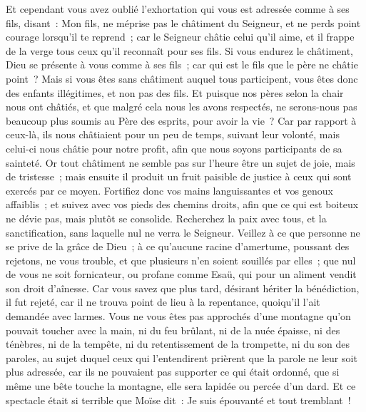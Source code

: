 \begin{multicols}{2}
Et cependant vous avez oublié l'exhortation qui vous est adressée comme à ses fils, disant~: Mon fils, ne méprise pas le châtiment du Seigneur, et ne perds point courage lorsqu'il te reprend~;
car le Seigneur châtie celui qu'il aime, et il frappe de la verge tous ceux qu'il reconnaît pour ses fils.
Si vous endurez le châtiment, Dieu se présente à vous comme à ses fils~; car qui est le fils que le père ne châtie point~?
Mais si vous êtes sans châtiment auquel tous participent, vous êtes donc des enfants illégitimes, et non pas des fils.
Et puisque nos pères selon la chair nous ont châtiés, et que malgré cela nous les avons respectés, ne serons-nous pas beaucoup plus soumis au Père des esprits, pour avoir la vie~?
Car par rapport à ceux-là, ils nous châtiaient pour un peu de temps, suivant leur volonté, mais celui-ci nous châtie pour notre profit, afin que nous soyons participants de sa sainteté.
Or tout châtiment ne semble pas sur l'heure être un sujet de joie, mais de tristesse~; mais ensuite il produit un fruit paisible de justice à ceux qui sont exercés par ce moyen.
Fortifiez donc vos mains languissantes et vos genoux affaiblis~;
et suivez avec vos pieds des chemins droits, afin que ce qui est boiteux ne dévie pas, mais plutôt se consolide.
Recherchez la paix avec tous, et la sanctification, sans laquelle nul ne verra le Seigneur.
Veillez à ce que personne ne se prive de la grâce de Dieu~; à ce qu'aucune racine d'amertume, poussant des rejetons, ne vous trouble, et que plusieurs n'en soient souillés par elles~;
que nul de vous ne soit fornicateur, ou profane comme Esaü, qui pour un aliment vendit son droit d'aînesse.
Car vous savez que plus tard, désirant hériter la bénédiction, il fut rejeté, car il ne trouva point de lieu à la repentance, quoiqu'il l'ait demandée avec larmes.
Vous ne vous êtes pas approchés d'une montagne qu'on pouvait toucher avec la main, ni du feu brûlant, ni de la nuée épaisse, ni des ténèbres, ni de la tempête,
ni du retentissement de la trompette, ni du son des paroles, au sujet duquel ceux qui l'entendirent prièrent que la parole ne leur soit plus adressée,
car ils ne pouvaient pas supporter ce qui était ordonné, que si même une bête touche la montagne, elle sera lapidée ou percée d'un dard.
Et ce spectacle était si terrible que Moïse dit~: Je suis épouvanté et tout tremblant~!

\end{multicols}
